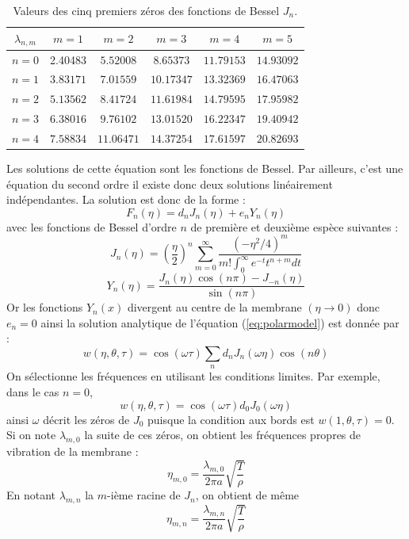 \documentclass[a4,12pt]{article}
\begin{document}

\begin{table}
	\begin{center}
		\begin{tabular}{|c|c|c|c|c|c|}
			\hline
			$\lambda_{n,m}$&$m=1$  &$m=2$ & $m=3$ &$ m=4$&$m=5$\\
			\hline
			$n=0$&2.40483&$5.52008$&$8.65373$&$11.79153$&$14.93092$\\
			\hline
			$n=1$&$3.83171$&$7.01559$&$10.17347$&$13.32369$&$16.47063$\\
			\hline
			$n=2$&$5.13562$&$8.41724$&$11.61984$&$14.79595$&$17.95982$\\
			\hline
			$n=3$&$6.38016$&$9.76102$&$13.01520$&$16.22347$&$19.40942$\\
			\hline
			$n=4$&$7.58834$&$11.06471$&$14.37254$&$17.61597$&$20.82693$\\
			\hline
		\end{tabular}
		\caption{Valeurs des cinq premiers zéros des fonctions de Bessel $J_n$.}
 	\end{center}
\end{table}

Les solutions de cette équation sont les fonctions de Bessel. Par ailleurs, c'est une équation du second ordre il existe donc deux solutions linéairement indépendantes. La solution est donc de la forme :
\[
F_n(\eta)=d_nJ_n(\eta)+e_nY_n(\eta)
\]
avec les fonctions de Bessel d'ordre $n$ de première et deuxième espèce suivantes :
\[
J_n(\eta)=\left(\dfrac{\eta}{2}\right)^n\sum_{m=0}^{\infty} \dfrac{(-\eta^2/4)^m}{m!\int_0^{\infty}e^{-t}t^{n+m}dt}
\]
\[
Y_n(\eta)=\dfrac{J_n(\eta)\cos(n\pi)-J_{-n}(\eta)}{\sin(n\pi)}
\]
Or les fonctions $Y_n(x)$ divergent au centre de la membrane $(\eta\rightarrow 0)$ donc $e_n=0$
ainsi la solution analytique de l'équation (\ref{eq:polarmodel}) est donnée par :
\[
w(\eta,\theta,\tau)=\cos(\omega \tau)\sum_n d_nJ_n(\omega\eta)\cos(n\theta)
\]
On sélectionne les fréquences en utilisant les conditions limites. Par exemple, dans le cas $n=0$, 
\[
w(\eta,\theta,\tau)=\cos(\omega \tau) d_0J_0(\omega \eta)
\]
ainsi $\omega$ décrit les zéros de $J_0$ puisque la condition aux bords est $w(1,\theta,\tau)=0$. Si on note $\lambda_{m,0}$ la suite de ces zéros, on obtient les fréquences propres de vibration de la membrane :
\[
\eta_{m,0}=\dfrac{\lambda_{m,0}}{2\pi a} \sqrt{\frac{T}{\rho}}
\]
En notant $\lambda_{m,n}$ la $m$-ième racine de $J_n$, on obtient de même 
\[
\eta_{m,n}=\dfrac{\lambda_{m,n}}{2\pi a} \sqrt{\frac{T}{\rho}}
\]
\end{document}
